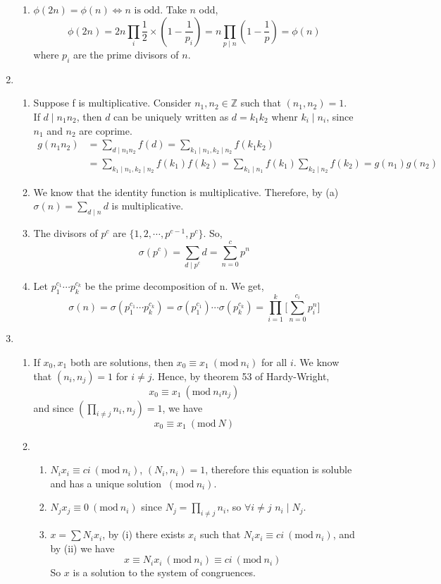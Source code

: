 \documentclass[11pt]{article}
\newcommand{\Mod}[1]{\ (\mathrm{mod}\ #1)}
\begin{document}
\begin{enumerate}
{\begin{enumerate}
\item $\phi(2n) = \phi(n) \Leftrightarrow n \mbox{ is odd}$. 
Take $n$ odd, $$ \phi(2n) = 2n \prod_{i} \frac{1}{2} \times(1-\frac{1}{p_i}) = n \prod_{p \mid n} (1-\frac{1}{p}) = \phi(n)$$
where $p_i$ are the prime divisors of $n$.
\end{enumerate}}
\item{\begin{enumerate}
\item Suppose f is multiplicative. Consider $n_1,n_2 \in \mathbb{Z}$ such that $(n_1,n_2)= 1$.\\
If $d\mid n_1 n_2$, then $d$ can be uniquely written as $d = k_1 k_2$ whenr $k_i \mid n_i$, since $n_1$ and $n_2$ are coprime. 
\begin{equation} 
\begin{split}
g(n_1n_2) & = \sum_{d\mid n_1n_2} f(d) = \sum_{k_1\mid n_1, k_2\mid n_2} f(k_1k_2)\\
&=\sum_{k_1\mid n_1, k_2\mid n_2} f(k_1)f(k_2)=  \sum_{k_1\mid n_1} f(k_1)\sum_{k_2\mid n_2} f(k_2) = g(n_1)g(n_2)
\end{split}
\end{equation}
\item We know that the identity function is multiplicative. Therefore, by (a) $\sigma (n) = \sum_{d\mid n} d$ is multiplicative.
\item The divisors of $p^c$ are $\lbrace 1, 2, \cdots , p^{c-1}, p^c\rbrace.$
So, $$ \sigma(p^c) = \sum_{d\mid p^c} d = \sum_{n=0}^{c} p^n$$
\item Let $p_{1}^{c_1} \cdots p_{k}^{c_k}$ be the prime decomposition of n. We get, 
$$ \sigma(n) = \sigma(p_{1}^{c_1} \cdots p_{k}^{c_k}) = \sigma(p_{1}^{c_1}) \cdots \sigma( p_{k}^{c_k})= \prod_{i=1}^{k}  \bigg[\sum_{n=0}^{c_i} p_i^n \bigg] $$

\end{enumerate}}
\item{\begin{enumerate}
\item If $x_0, x_1$ both are solutions, then $x_0 \equiv x_1 \Mod{n_i}$ for all $i$. We know that $(n_i,n_j) =1 $ for $i \not = j$. Hence, by theorem 53 of Hardy-Wright, $$x_0 \equiv x_1 \Mod{n_i n_j}$$ and since $(\prod_{i \not = j} n_i, n_j) = 1$, we have $$x_0 \equiv x_1 \Mod{N}$$
\item{\begin{enumerate}
\item $N_ix_i \equiv ci \Mod{n_i}$, $(N_i, n_i) = 1$, therefore this equation is soluble and has a unique solution $\Mod{n_i}$. 
\item $N_j x_j \equiv 0 \Mod{n_i}$ since $N_j = \prod_{i \not = j} n_i$, so $\forall i\not =j $ $n_i\mid N_j$.
\item $x = \sum N_ix_i$, by (i) there exists $x_i$ such that $N_ix_i \equiv ci \Mod{n_i}$, and by (ii) we have $$x \equiv N_ix_i \Mod{n_i} \equiv ci \Mod{n_i}$$
So $x$ is a solution to the system of congruences.


\end{enumerate}}
\end{enumerate}}
\end{enumerate}
\end{document}
